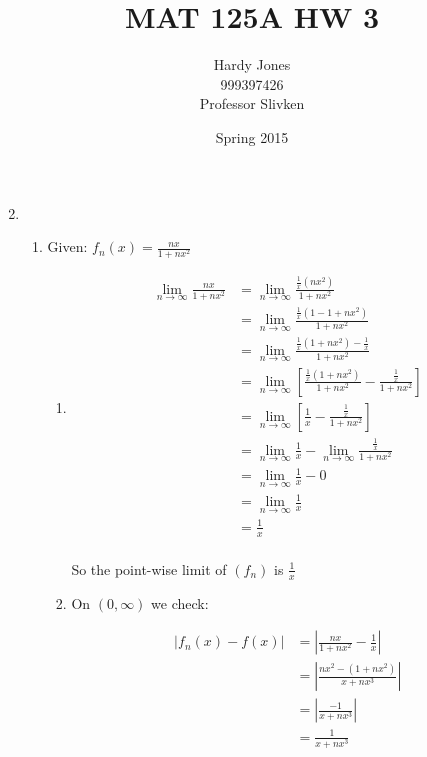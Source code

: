 \documentclass[12pt,letterpaper]{article}
\title{MAT 125A HW 3\vspace{-2ex}}
\author{Hardy Jones\\
        999397426\\
        Professor Slivken\vspace{-2ex}}
\date{Spring 2015}
\begin{document}
  \maketitle

  \begin{enumerate}
    \setcounter{enumi}{1}
    \item
      \begin{enumerate}
        \item
          Given: $f_n(x) = \frac{nx}{1 + nx^2}$
          \begin{enumerate}
            \item
              \begin{align*}
                \lim_{n \to \infty}\frac{nx}{1 + nx^2}
                &= \lim_{n \to \infty}\frac{\frac{1}{x}\left(nx^2\right)}{1 + nx^2} \\
                &= \lim_{n \to \infty}\frac{\frac{1}{x}\left(1 - 1 + nx^2\right)}{1 + nx^2} \\
                &= \lim_{n \to \infty}\frac{\frac{1}{x}\left(1 + nx^2\right) - \frac{1}{x}}{1 + nx^2} \\
                &= \lim_{n \to \infty}\left[\frac{\frac{1}{x}\left(1 + nx^2\right)}{1 + nx^2} - \frac{\frac{1}{x}}{1 + nx^2}\right] \\
                &= \lim_{n \to \infty}\left[\frac{1}{x} - \frac{\frac{1}{x}}{1 + nx^2}\right] \\
                &= \lim_{n \to \infty}\frac{1}{x} - \lim_{n \to \infty}\frac{\frac{1}{x}}{1 + nx^2} \\
                &= \lim_{n \to \infty}\frac{1}{x} - 0 \\
                &= \lim_{n \to \infty}\frac{1}{x} \\
                &= \frac{1}{x} \\
              \end{align*}

              So the point-wise limit of $(f_n)$ is $\frac{1}{x}$
            \item
              On $\left(0, \infty\right)$ we check:

              \begin{align*}
                \left|f_n(x) - f(x)\right|
                &= \left|\frac{nx}{1 + nx^2} - \frac{1}{x}\right| \\
                &= \left|\frac{nx^2 - (1 + nx^2)}{x + nx^3}\right| \\
                &= \left|\frac{-1}{x + nx^3}\right| \\
                &= \frac{1}{x + nx^3} \\
              \end{align*}


\end{enumerate}
\end{enumerate}
\end{enumerate}
\end{document}

